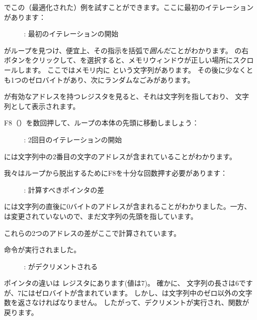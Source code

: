 ﻿\clearpage
{}
\myindex{\olly}

\olly でこの（最適化された）例を試すことができます。ここに最初のイテレーションがあります：

\begin{figure}[H]
\centering
{}
\caption{\olly: 最初のイテレーションの開始}
\label{fig:strlen_olly_1}
\end{figure}

\olly がループを見つけ、便宜上、その指示を括弧で\emph{囲んだ}ことがわかります。 
\EAX の右ボタンをクリックして、を選択すると、メモリウィンドウが正しい場所にスクロールします。
ここではメモリ内に という文字列があります。
その後に少なくとも1つのゼロバイトがあり、次にランダムなごみがあります。

\olly が有効なアドレスを持つレジスタを見ると、それは文字列を指しており、
文字列として表示されます。

\clearpage
F8（\stepover）を数回押して、ループの本体の先頭に移動しましょう：

\begin{figure}[H]
\centering
{}
\caption{\olly: 2回目のイテレーションの開始}
\label{fig:strlen_olly_2}
\end{figure}

\EAX には文字列中の2番目の文字のアドレスが含まれていることがわかります。

\clearpage

我々はループから脱出するためにF8を十分な回数押す必要があります：

\begin{figure}[H]
\centering
{}
\caption{\olly: 計算すべきポインタの差}
\label{fig:strlen_olly_3}
\end{figure}

\EAX には文字列の直後に0バイトのアドレスが含まれることがわかりました。一方、
\EDX は変更されていないので、まだ文字列の先頭を指しています。

これらの2つのアドレスの差がここで計算されています。

\clearpage
\SUB 命令が実行されました。

\begin{figure}[H]
\centering
{}
\caption{\olly: \EAX がデクリメントされる}
\label{fig:strlen_olly_4}
\end{figure}

ポインタの違いは \EAX レジスタにあります(値は7)。
確かに、 文字列の長さは6ですが、7にはゼロバイトが含まれています。
しかし、は文字列中のゼロ以外の文字数を返さなければなりません。
したがって、デクリメントが実行され、関数が戻ります。
